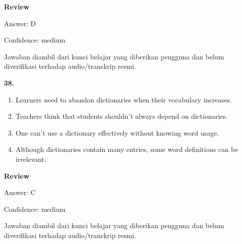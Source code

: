 \documentclass[12pt]{article}
\begin{document}
\begingroup
\setlength{\parskip}{0pt}
\setlength{\parindent}{0pt}
\textbf{Review}\par
Answer: D\par
Confidence: medium\par
Jawaban diambil dari kunci belajar yang diberikan pengguna dan belum diverifikasi terhadap audio/transkrip resmi.\par
\endgroup
\par
\vspace{0.25\baselineskip}
\noindent\textbf{38.}
\begin{enumerate}[label=(\Alph*),leftmargin=*,itemsep=0.2em]
\item Learners need to abandon dictionaries when their vocabulary increases.
\item Teachers think that students shouldn't always depend on dictionaries.
\item One can't use a dictionary effectively without knowing word usage.
\item Although dictionaries contain many entries, some word definitions can be irrelevant.
\end{enumerate}
\par
\begingroup
\setlength{\parskip}{0pt}
\setlength{\parindent}{0pt}
\textbf{Review}\par
Answer: C\par
Confidence: medium\par
Jawaban diambil dari kunci belajar yang diberikan pengguna dan belum diverifikasi terhadap audio/transkrip resmi.\par
\endgroup
\par
\vspace{0.25\baselineskip}
\end{document}

